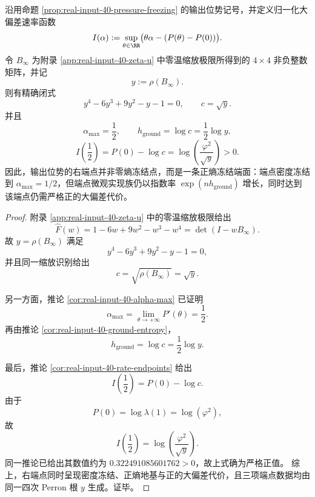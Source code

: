 \begin{theorem}\label{thm:xi-terminal-real-input-positive-entropy-freezing-face}
沿用命题 \ref{prop:real-input-40-pressure-freezing} 的输出位势记号，并定义归一化大偏差速率函数
\[
I(\alpha):=\sup_{\theta\in\RR}\bigl(\theta\alpha-(P(\theta)-P(0))\bigr).
\]
令 \(B_\infty\) 为附录 \ref{app:real-input-40-zeta-u} 中零温缩放极限所得到的 \(4\times 4\) 非负整数矩阵，并记
\[
y:=\rho(B_\infty).
\]
则有精确闭式
\[
\boxed{\;
y^4-6y^3+9y^2-y-1=0,
\qquad
c=\sqrt y.\;}
\]
并且
\[
\boxed{\;
\alpha_{\max}=\frac12,
\qquad
h_{\mathrm{ground}}=\log c=\frac12\log y,\;}
\]
\[
\boxed{\;
I\!\left(\frac12\right)=P(0)-\log c
=
\log\!\left(\frac{\varphi^2}{\sqrt y}\right)>0.\;}
\]
因此，输出位势的右端点并非零熵冻结点，而是一条正熵冻结端面：端点密度冻结到 \(\alpha_{\max}=1/2\)，但端点微观实现族仍以指数率 \(\exp(n h_{\mathrm{ground}})\) 增长，同时达到该端点仍需严格正的大偏差代价。
\end{theorem}
\begin{proof}
附录 \ref{app:real-input-40-zeta-u} 中的零温缩放极限给出
\[
\widehat F(w)=1-6w+9w^2-w^3-w^4=\det(I-wB_\infty).
\]
故 \(y=\rho(B_\infty)\) 满足
\[
y^4-6y^3+9y^2-y-1=0,
\]
并且同一缩放识别给出
\[
c=\sqrt{\rho(B_\infty)}=\sqrt y.
\]

另一方面，推论 \ref{cor:real-input-40-alpha-max} 已证明
\[
\alpha_{\max}=\lim_{\theta\to+\infty}P'(\theta)=\frac12.
\]
再由推论 \ref{cor:real-input-40-ground-entropy}，
\[
h_{\mathrm{ground}}=\log c=\frac12\log y.
\]

最后，推论 \ref{cor:real-input-40-rate-endpoints} 给出
\[
I\!\left(\frac12\right)=P(0)-\log c.
\]
由于
\[
P(0)=\log\lambda(1)=\log(\varphi^2),
\]
故
\[
I\!\left(\frac12\right)=\log\!\left(\frac{\varphi^2}{\sqrt y}\right).
\]
同一推论已给出其数值约为 \(0.322491085601762>0\)，故上式确为严格正值。
综上，右端点同时呈现密度冻结、正熵地基与正的大偏差代价，且三项端点数据均由同一四次 Perron 根 \(y\) 生成。证毕。
\end{proof}

\endinput
